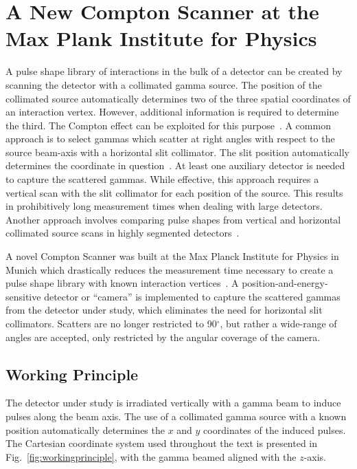 \chapter{A New Compton Scanner at the Max Plank Institute for Physics} \label{chap:scanner}

A pulse shape library of interactions in the bulk of a detector can be created by scanning the detector with a collimated gamma source. The position of the collimated source automatically determines two of the three spatial coordinates of an interaction vertex. However, additional information is required to determine the third. The Compton effect can be exploited for this purpose~\cite{Petry1993,Vetter2000,Abt2008,Dimmock2009,Ha2013,vonSturm2017}. A common approach is to select gammas which scatter at right angles with respect to the source beam-axis with a horizontal slit collimator. The slit position automatically determines the coordinate in question~\cite{Vetter2000,Dimmock2009,Ha2013,vonSturm2017}. At least one auxiliary detector is needed to capture the scattered gammas. While effective, this approach requires a vertical scan with the slit collimator for each position of the source. This results in prohibitively long measurement times when dealing with large detectors. Another approach involves comparing pulse shapes from vertical and horizontal collimated source scans in highly segmented detectors~\cite{Crespi2008,DeCanditiis2020}.

A novel Compton Scanner was built at the Max Planck Institute for Physics in Munich which drastically reduces the measurement time necessary to create a pulse shape library with known interaction vertices~\cite{compton_scanner}. A position-and-energy-sensitive detector or ``camera'' is implemented to capture the scattered gammas from the detector under study, which eliminates the need for horizontal slit collimators. Scatters are no longer restricted to 90$^{\circ}$, but rather a wide-range of angles are accepted, only restricted by the angular coverage of the camera.

\section{Working Principle}\label{sec:workingprinciple}

The detector under study is irradiated vertically with a gamma beam to induce pulses along the beam axis. The use of a collimated gamma source with a known position automatically determines the $x$ and $y$ coordinates of the induced pulses. The Cartesian coordinate system used throughout the text is presented in Fig.~\ref{fig:workingprinciple}, with the gamma beamed aligned with the $z$-axis. 

